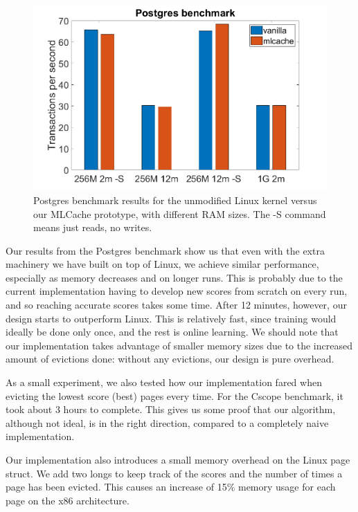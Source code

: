 \label{fig:pg}


\begin{figure}[h]
	\includegraphics[scale=0.3]{img/postgres_results_bigger.png}
	\caption{Postgres benchmark results for the unmodified Linux kernel versus our MLCache prototype, with different RAM sizes. The -S command means just reads, no writes.}
\end{figure}

Our results from the Postgres benchmark show us that even with the extra machinery we have built on top of Linux, we achieve similar performance, especially as memory decreases and on longer runs. This is probably due to the current implementation having to develop new scores from scratch on every run, and so reaching accurate scores takes some time. After 12 minutes, however, our design starts to outperform Linux. This is relatively fast, since training would ideally be done only once, and the rest is online learning. We should note that our implementation takes advantage of smaller memory sizes due to the increased amount of evictions done: without any evictions, our design is pure overhead.

As a small experiment, we also tested how our implementation fared when evicting the lowest score (best) pages every time. For the Cscope benchmark, it took about 3 hours to complete. This gives us some proof that our algorithm, although not ideal, is in the right direction, compared to a completely naive implementation. 

Our implementation also introduces a small memory overhead on the Linux page struct. We add two longs to keep track of the scores and the number of times a page has been evicted. This causes an increase of 15\% memory usage for each page on the x86 architecture.